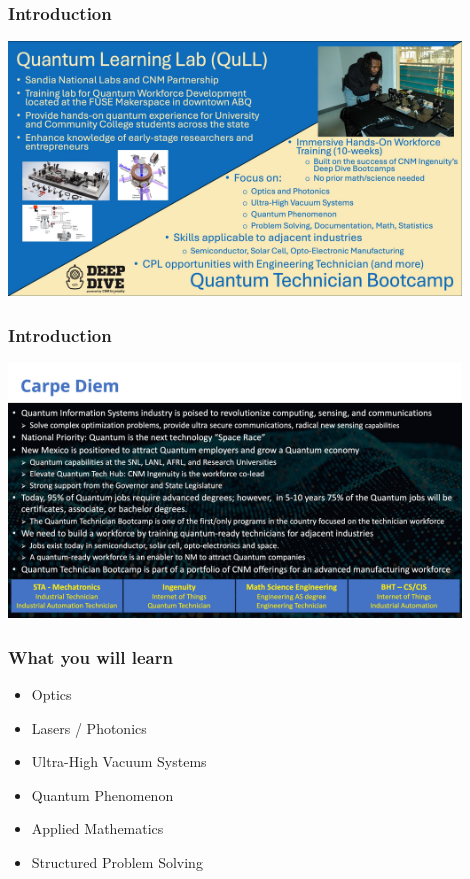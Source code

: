 \documentclass{beamer}
\begin{document}
\begin{frame}\frametitle{Introduction}
\begin{center}
\includegraphics[width=12cm]{fig/Slide14.jpeg}
\end{center}
\end{frame}

\begin{frame}\frametitle{Introduction}
\begin{center}
\includegraphics[width=12cm]{fig/Slide15.jpeg}
\end{center}
\end{frame}



\begin{frame}\frametitle{What you will learn}
\begin{itemize}
\item Optics
\item Lasers / Photonics
\item Ultra-High Vacuum Systems
\item Quantum Phenomenon
\item Applied Mathematics
\item Structured Problem Solving
\end{itemize}
\end{frame}
\end{document}
